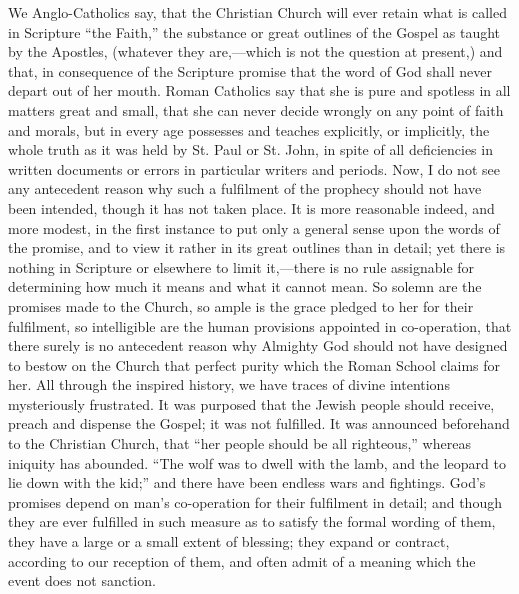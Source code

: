 We Anglo-Catholics say, that the Christian Church will ever retain
what is called in Scripture ``the Faith,'' the substance or
great outlines of the Gospel as taught by the Apostles, (whatever they
are,—which is not the question at present,) and that, in consequence
of the Scripture promise that the word of God shall never depart out
of her mouth. Roman Catholics say that she is pure and spotless in all
matters great and small, that she can never decide wrongly on any
point of faith and morals, but in every age possesses and teaches
explicitly, or implicitly, the whole truth as it was held by St. Paul
or St. John, in spite of all deficiencies in written documents or
errors in particular writers and periods. Now, I do not see any
antecedent reason why such a fulfilment of the prophecy should not
have been intended, though it has not taken place. It is more
reasonable indeed, and more modest, in the first instance to put only
a general sense upon the words of the promise, and to view it rather
in its great outlines than in detail; yet there is nothing in
Scripture or elsewhere to limit it,—there is no rule assignable for
determining how much it means and what it cannot mean. So solemn are
the promises made to the Church, so ample is the grace pledged to her
for their fulfilment, so intelligible are the human provisions
appointed in co-operation, that there surely is no antecedent reason
why Almighty God should not have designed to bestow on the Church that
perfect purity which the Roman School claims for her. All through the
inspired history, we have traces of divine intentions mysteriously
frustrated. It was purposed that the Jewish people should receive,
preach and dispense the Gospel; it was not fulfilled. It was announced
beforehand to the Christian Church, that ``her people should be
all righteous,'' whereas iniquity has abounded. ``The
wolf was to dwell with the lamb, and the leopard to lie down with the
kid;'' and there have been endless wars and fightings. God's
promises depend on man's co-operation for their fulfilment in detail;
and though they are ever fulfilled in such measure as to satisfy the
formal wording of them, they have a large or a small extent of
blessing; they expand or contract, according to our reception of them,
and often admit of a meaning which the event does not sanction.

